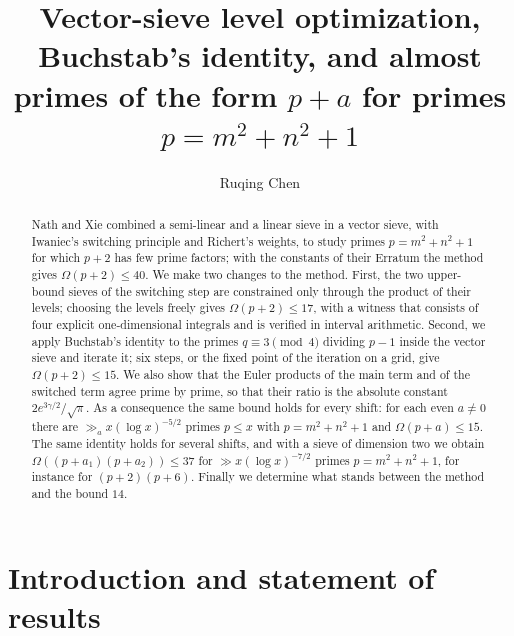\documentclass[11pt,a4paper]{amsart}
\title[Almost primes $p+a$ with $p=m^2+n^2+1$]{Vector-sieve level optimization, Buchstab's identity, and almost
primes of the form $p+a$ for primes $p=m^2+n^2+1$}
\author{Ruqing Chen}
\theoremstyle{remark}
\numberwithin{equation}{section}
\begin{document}
\begin{abstract}
Nath and Xie combined a semi-linear and a linear sieve in a vector sieve, with Iwaniec's switching principle and
Richert's weights, to study primes $p=m^2+n^2+1$ for which $p+2$ has few prime factors; with the constants of
their Erratum the method gives $\Omega(p+2)\le40$. We make two changes to the method. First, the two upper-bound
sieves of the switching step are constrained only through the product of their levels; choosing the levels
freely gives $\Omega(p+2)\le17$, with a witness that consists of four explicit one-dimensional integrals and is
verified in interval arithmetic. Second, we apply Buchstab's identity to the primes $q\equiv3\pmod4$ dividing
$p-1$ inside the vector sieve and iterate it; six steps, or the fixed point of the iteration on a grid, give
$\Omega(p+2)\le15$. We also show that the Euler products of the main term and of the switched term agree
prime by prime, so that their ratio is the absolute constant $2e^{3\gamma/2}/\sqrt\pi$. As a consequence the
same bound holds for every shift: for each even $a\ne0$ there are $\gg_a x(\log x)^{-5/2}$ primes $p\le x$ with
$p=m^2+n^2+1$ and $\Omega(p+a)\le15$. The same identity holds for several shifts, and with a sieve of dimension two we obtain
$\Omega((p+a_1)(p+a_2))\le37$ for $\gg x(\log x)^{-7/2}$ primes $p=m^2+n^2+1$, for instance for $(p+2)(p+6)$.
Finally we determine what stands between the method and the bound $14$.
\end{abstract}

\maketitle

\section{Introduction and statement of results}\label{sec:intro}
\end{document}
